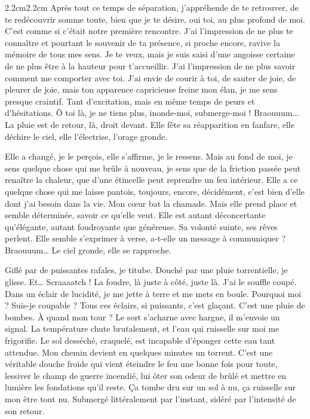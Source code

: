 \begin{adjustwidth}{2.2cm}{2.2cm}
Après tout ce temps de séparation, j’appréhende de te retrouver, de te redécouvrir somme toute, bien que je te désire, oui toi, au plus profond de moi. C’est comme si c’était notre première rencontre. J’ai l’impression de ne plus te connaître et pourtant le souvenir de ta présence, si proche encore, ravive la mémoire de tous mes sens.  Je te veux, mais je suis saisi d’une angoisse certaine de ne plus être à la hauteur pour t’accueillir. J’ai l’impression de ne plus savoir comment me comporter avec toi. J’ai envie de courir à toi, de sauter de joie, de pleurer de joie, mais ton apparence capricieuse freine mon élan, je me sens presque craintif. Tant d’excitation, mais en même temps de peurs et d’hésitations. Ô toi là, je ne tiens plus, inonde-moi, submerge-moi ! Braouuum... La pluie est de retour, là, droit devant. Elle fête sa réapparition en fanfare, elle déchire le ciel, elle l’électrise, l’orage gronde. 

Elle a changé, je le perçois, elle s’affirme, je le ressens. Mais au fond de moi, je sens quelque chose qui me brûle à nouveau, je sens que de la friction passée peut renaître la chaleur, que d’une étincelle peut reprendre un feu intérieur. Elle a ce quelque chose qui me laisse pantois, toujours, encore, décidément, c’est bien d’elle dont j’ai besoin dans la vie. Mon cœur bat la chamade. Mais elle prend place et semble déterminée, savoir ce qu’elle veut. Elle est autant déconcertante qu’élégante, autant foudroyante que généreuse. Sa volonté suinte, ses rêves perlent. Elle semble s’exprimer à verse, a-t-elle un message à communiquer ? Braouuum… Le ciel gronde, elle se rapproche.

Giflé par de puissantes rafales, je titube. Douché par une pluie torrentielle, je glisse. Et… Scraaaatch ! La foudre, là juste à côté, juste là. J’ai le souffle coupé. Dans un éclair de lucidité, je me jette à terre et me mets en boule. Pourquoi moi ? Suis-je coupable ? Tous ces éclairs, si puissants, c’est glaçant. C’est une pluie de bombes. À quand mon tour ? Le sort s’acharne avec hargne, il m’envoie un signal. La température chute brutalement, et l’eau qui ruisselle sur moi me frigorifie. Le sol desséché, craquelé, est incapable d’éponger cette eau tant attendue. Mon chemin devient en quelques minutes un torrent. C’est une véritable douche froide qui vient éteindre le feu une bonne fois pour toute, lessiver le champ de guerre incendié, lui ôter son odeur de brûlé et mettre en lumière les fondations qu’il reste. Ça tombe dru sur un sol à nu, ça ruisselle sur mon être tout nu. Submergé littéralement par l’instant, sidéré par l’intensité de son retour.


\end{adjustwidth}
